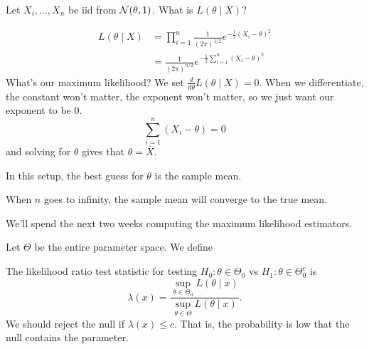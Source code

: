 \begin{example}
    Let $X_i, \dots, X_n$ be iid from $\mathcal N(\theta, 1)$. What is $L(\theta\mid X)$?

    \begin{align*}
        L(\theta\mid X) & = \prod_{i=1}^n \frac{1}{(2\pi)^{1/2}}e^{-\frac{1}{2}(X_i - \theta)^2} \\
                        & = \frac{1}{(2\pi)^{n/2}}e^{-\frac{1}{2}\sum^n_{i=1}(X_i - \theta)^2}
    \end{align*}
    What's our maximum likelihood? We set $\frac{d}{d\theta}L(\theta\mid X) = 0$. When we differentiate, the constant won't matter, the exponent won't matter, so we just want our exponent to be $0$.
    \[\sum^n_{i=1}(X_i - \theta) = 0\]
    and solving for $\theta$ gives that $\theta = \bar{X}$.

    In this setup, the best guess for $\theta$ is the sample mean.

    When $n$ goes to infinity, the sample mean will converge to the true mean.
\end{example}
We'll spend the next two weeks computing the maximum likelihood estimators.

Let $\Theta$ be the entire parameter space. We define
\begin{definition}
    The likelihood ratio test statistic for testing $H_0 : \theta\in \Theta_0$ vs $H_1: \theta\in \Theta_0^c$ is
    \[\lambda(x) = \frac{\sup_{\theta \in \Theta_0}L(\theta\mid x)}{\sup_{\theta\in\Theta}L(\theta\mid x)}.\]
    We should reject the null if $\lambda(x) \leq c$. That is, the probability is low that the null contains the parameter.
\end{definition}

